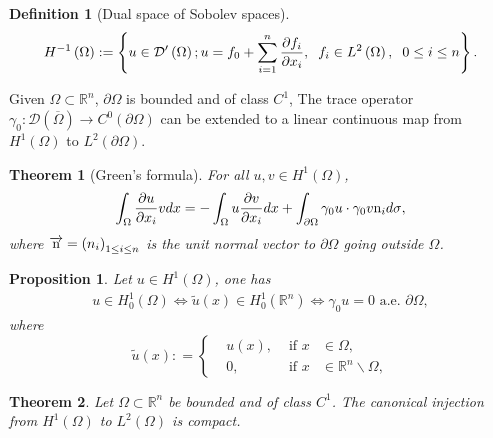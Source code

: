 \documentclass[11pt,a4paper,center,notitlepage]{article}
\numberwithin{equation}{section}
\newtheorem{definition}{Definition}[section]
\newtheorem{prop}{Proposition}[section]
\newtheorem{theorem}{Theorem}[section]
\begin{document}
\begin{definition}[Dual space of Sobolev spaces]
\begin{align}
{H^{ - 1}}\left( \Omega  \right): = \left\{ {u \in \mathcal{D}'\left( \Omega  \right);u = {f_0} + \sum\limits_{i = 1}^n {\frac{{\partial {f_i}}}{{\partial {x_i}}}} ,\hspace{2mm}{f_i} \in {L^2}\left( \Omega  \right),\hspace{2mm}0 \le i \le n} \right\}.
\end{align}
\end{definition}
Given $\Omega \subset \mathbb{R}^n$, $\partial \Omega$ is bounded and of class $C^1$, The trace operator ${\gamma _0}:\mathcal{D}\left( {\overline \Omega  } \right) \to {C^0}\left( {\partial \Omega } \right)$ can be extended to a linear continuous map from $H^1\left(\Omega\right)$ to $L^2\left(\partial \Omega\right)$. 
\begin{theorem}[Green's formula]
For all $u,v\in H^1\left(\Omega\right)$,
\begin{align}
\int_\Omega  {\frac{{\partial u}}{{\partial {x_i}}}vdx}  =  - \int_\Omega  {u\frac{{\partial v}}{{\partial {x_i}}}dx}  + \int_{\partial \Omega } {{\gamma _0}u \cdot {\gamma _0}v{{\rm n}_i}d\sigma } ,
\end{align}
where $\overrightarrow  {\rm n} = {\left( {{n_i}} \right)_{1 \le i \le n}}$ is the unit normal vector to $\partial \Omega$ going outside $\Omega$.
\end{theorem}

\begin{prop}
Let $u\in H^1\left(\Omega\right)$, one has
\begin{align}
u \in H_0^1\left( \Omega  \right) \Leftrightarrow \widetilde u\left( x \right) \in H_0^1\left( {{\mathbb{R}^n}} \right) \Leftrightarrow {\gamma _0}u = 0 \mbox{ a.e. }\partial \Omega ,
\end{align}
where 
\begin{equation}
\widetilde u\left( x \right): = \left\{ \begin{split}
& u\left( x \right), & \mbox{ if } x &\in \Omega ,\\
& 0, & \mbox{ if } x &\in {\mathbb{R}^n}\backslash \Omega ,
\end{split} \right.
\end{equation}
\end{prop}

\begin{theorem}
Let $\Omega \subset \mathbb{R}^n$ be bounded and of class $C^1$. The canonical injection from $H^1\left(\Omega\right)$ to $L^2\left(\Omega\right)$ is compact.
\end{theorem}
\end{document}
